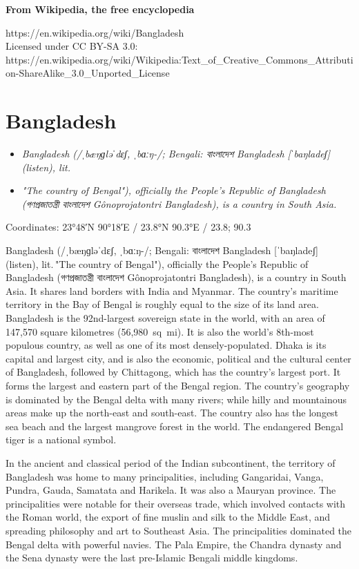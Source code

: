 \textbf{From Wikipedia, the free encyclopedia}

https://en.wikipedia.org/wiki/Bangladesh\\
Licensed under CC BY-SA 3.0:\\
https://en.wikipedia.org/wiki/Wikipedia:Text\_of\_Creative\_Commons\_Attribution-ShareAlike\_3.0\_Unported\_License

\section{Bangladesh}\label{bangladesh}

\begin{itemize}
\item
  \emph{Bangladesh (/ˌbæŋɡləˈdɛʃ, ˌbɑːŋ-/; Bengali: বাংলাদেশ Bangladesh
  {[}ˈbaŋladeʃ{]} (listen), lit.}
\item
  \emph{"The country of Bengal"), officially the People's Republic of
  Bangladesh (গণপ্রজাতন্ত্রী বাংলাদেশ Gônoprojatontri Bangladesh), is a
  country in South Asia.}
\end{itemize}

Coordinates: 23°48′N 90°18′E﻿ / ﻿23.8°N 90.3°E﻿ / 23.8; 90.3

Bangladesh (/ˌbæŋɡləˈdɛʃ, ˌbɑːŋ-/; Bengali: বাংলাদেশ Bangladesh
{[}ˈbaŋladeʃ{]} (listen), lit. "The country of Bengal"), officially the
People's Republic of Bangladesh (গণপ্রজাতন্ত্রী বাংলাদেশ Gônoprojatontri
Bangladesh), is a country in South Asia. It shares land borders with
India and Myanmar. The country's maritime territory in the Bay of Bengal
is roughly equal to the size of its land area. Bangladesh is the
92nd-largest sovereign state in the world, with an area of 147,570
square kilometres (56,980~sq~mi). It is also the world's 8th-most
populous country, as well as one of its most densely-populated. Dhaka is
its capital and largest city, and is also the economic, political and
the cultural center of Bangladesh, followed by Chittagong, which has the
country's largest port. It forms the largest and eastern part of the
Bengal region. The country's geography is dominated by the Bengal delta
with many rivers; while hilly and mountainous areas make up the
north-east and south-east. The country also has the longest sea beach
and the largest mangrove forest in the world. The endangered Bengal
tiger is a national symbol.

In the ancient and classical period of the Indian subcontinent, the
territory of Bangladesh was home to many principalities, including
Gangaridai, Vanga, Pundra, Gauda, Samatata and Harikela. It was also a
Mauryan province. The principalities were notable for their overseas
trade, which involved contacts with the Roman world, the export of fine
muslin and silk to the Middle East, and spreading philosophy and art to
Southeast Asia. The principalities dominated the Bengal delta with
powerful navies. The Pala Empire, the Chandra dynasty and the Sena
dynasty were the last pre-Islamic Bengali middle kingdoms.

